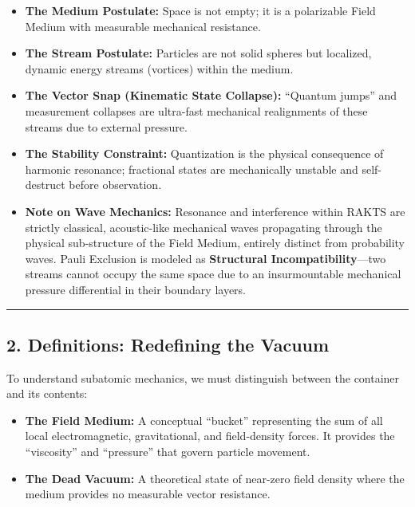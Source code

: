 \documentclass[
]{article}
\providecommand{\tightlist}{%
  \setlength{\itemsep}{0pt}\setlength{\parskip}{0pt}}
\begin{document}
\begin{itemize}
\tightlist
\item
  \textbf{The Medium Postulate:} Space is not empty; it is a polarizable
  Field Medium with measurable mechanical resistance.
\item
  \textbf{The Stream Postulate:} Particles are not solid spheres but
  localized, dynamic energy streams (vortices) within the medium.
\item
  \textbf{The Vector Snap (Kinematic State Collapse):} ``Quantum jumps''
  and measurement collapses are ultra-fast mechanical realignments of
  these streams due to external pressure.
\item
  \textbf{The Stability Constraint:} Quantization is the physical
  consequence of harmonic resonance; fractional states are mechanically
  unstable and self-destruct before observation.
\item
  \textbf{Note on Wave Mechanics:} Resonance and interference within
  RAKTS are strictly classical, acoustic-like mechanical waves
  propagating through the physical sub-structure of the Field Medium,
  entirely distinct from probability waves. Pauli Exclusion is modeled
  as \textbf{Structural Incompatibility}---two streams cannot occupy the
  same space due to an insurmountable mechanical pressure differential
  in their boundary layers.
\end{itemize}

\begin{center}\rule{0.5\linewidth}{0.5pt}\end{center}

\subsection{2. Definitions: Redefining the
Vacuum}\label{definitions-redefining-the-vacuum}

To understand subatomic mechanics, we must distinguish between the
container and its contents:

\begin{itemize}
\tightlist
\item
  \textbf{The Field Medium:} A conceptual ``bucket'' representing the
  sum of all local electromagnetic, gravitational, and field-density
  forces. It provides the ``viscosity'' and ``pressure'' that govern
  particle movement.
\item
  \textbf{The Dead Vacuum:} A theoretical state of near-zero field
  density where the medium provides no measurable vector resistance.
\end{itemize}
\end{document}
